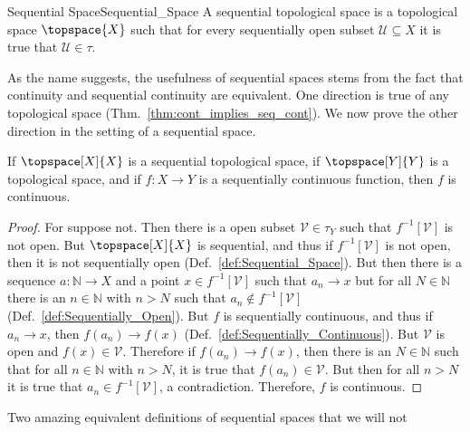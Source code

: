 \documentclass{article}                                                        %
\begin{document}
        \begin{fdefinition}{Sequential Space}{Sequential_Space}
            A sequential topological space is a topological space
            $\topspace{X}$ such that for every sequentially open subset
            $\mathcal{U}\subseteq{X}$ it is true that $\mathcal{U}\in\tau$.
        \end{fdefinition}
        As the name suggests, the usefulness of sequential spaces stems from the
        fact that continuity and sequential continuity are equivalent. One
        direction is true of any topological space
        (Thm.~\ref{thm:cont_implies_seq_cont}). We now prove the other direction
        in the setting of a sequential space.
        \begin{theorem}
            \label{thm:seq_space_seq_cont_eqiv_cont}%
            If $\topspace[X]{X}$ is a sequential topological space, if
            $\topspace[Y]{Y}$ is a topological space, and if $f:X\rightarrow{Y}$
            is a sequentially continuous function, then $f$ is continuous.
        \end{theorem}
        \begin{proof}
            For suppose not. Then there is a open subset
            $\mathcal{V}\in\tau_{Y}$ such that $f^{\minus{1}}[\mathcal{V}]$ is
            not open. But $\topspace[X]{X}$ is sequential, and thus if
            $f^{\minus{1}}[\mathcal{V}]$ is not open, then it is not
            sequentially open (Def.~\ref{def:Sequential_Space}). But then there
            is a sequence $a:\mathbb{N}\rightarrow{X}$ and a point
            $x\in{f}^{\minus{1}}[\mathcal{V}]$ such that $a_{n}\rightarrow{x}$
            but for all $N\in\mathbb{N}$ there is an $n\in\mathbb{N}$ with
            $n>N$ such that $a_{n}\notin{f}^{\minus{1}}[\mathcal{V}]$
            (Def.~\ref{def:Sequentially_Open}). But $f$ is sequentially
            continuous, and thus if $a_{n}\rightarrow{x}$, then
            $f(a_{n})\rightarrow{f}(x)$
            (Def.~\ref{def:Sequentially_Continuous}). But $\mathcal{V}$ is open
            and $f(x)\in\mathcal{V}$. Therefore if $f(a_{n})\rightarrow{f}(x)$,
            then there is an $N\in\mathbb{N}$ such that for all $n\in\mathbb{N}$
            with $n>N$, it is true that $f(a_{n})\in\mathcal{V}$. But then for
            all $n>N$ it is true that $a_{n}\in{f}^{\minus{1}}[\mathcal{V}]$, a
            contradiction. Therefore, $f$ is continuous.
        \end{proof}
        Two amazing equivalent definitions of sequential spaces that we will not
\end{document}
